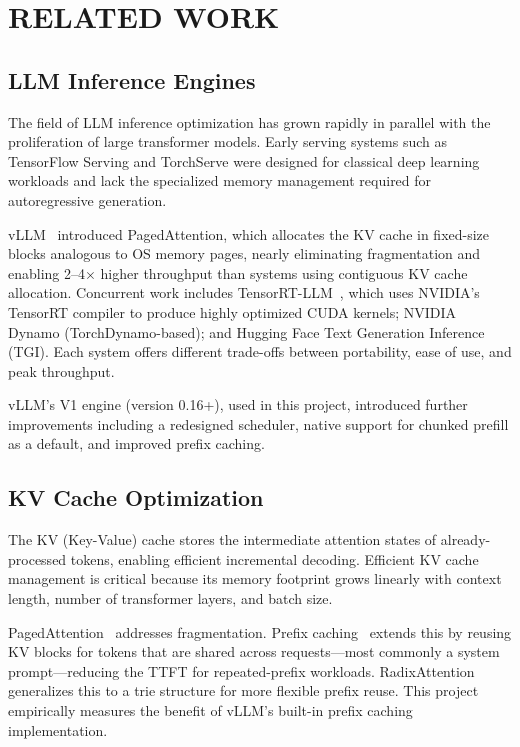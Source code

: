\documentclass[a4paper,12pt]{report}
\begin{document}
\chapter{RELATED WORK}

\section{LLM Inference Engines}

The field of LLM inference optimization has grown rapidly in parallel with the proliferation of large transformer models. Early serving systems such as TensorFlow Serving and TorchServe were designed for classical deep learning workloads and lack the specialized memory management required for autoregressive generation.

vLLM~\cite{kwon2023efficient} introduced PagedAttention, which allocates the KV cache in fixed-size blocks analogous to OS memory pages, nearly eliminating fragmentation and enabling 2--4$\times$ higher throughput than systems using contiguous KV cache allocation. Concurrent work includes TensorRT-LLM~\cite{tensorrt}, which uses NVIDIA's TensorRT compiler to produce highly optimized CUDA kernels; NVIDIA Dynamo (TorchDynamo-based); and Hugging Face Text Generation Inference (TGI). Each system offers different trade-offs between portability, ease of use, and peak throughput.

vLLM's V1 engine (version 0.16+), used in this project, introduced further improvements including a redesigned scheduler, native support for chunked prefill as a default, and improved prefix caching.

\section{KV Cache Optimization}

The KV (Key-Value) cache stores the intermediate attention states of already-processed tokens, enabling efficient incremental decoding. Efficient KV cache management is critical because its memory footprint grows linearly with context length, number of transformer layers, and batch size.

PagedAttention~\cite{kwon2023efficient} addresses fragmentation. Prefix caching~\cite{zheng2023efficiently} extends this by reusing KV blocks for tokens that are shared across requests---most commonly a system prompt---reducing the TTFT for repeated-prefix workloads. RadixAttention~\cite{radix} generalizes this to a trie structure for more flexible prefix reuse. This project empirically measures the benefit of vLLM's built-in prefix caching implementation.
\end{document}
